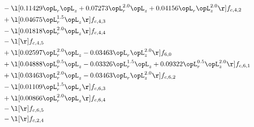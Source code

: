 \begin{alignat}{2}
& - \l[  0.11429 \opL_r \opL_z +  0.07273 \opL_r^{2.0} \opL_z +  0.04156 \opL_r \opL_z^{2.0}  \r] f_{c,4,2} \nonumber \\ 
& + \l[  0.04675 \opL_r^{1.5} \opL_z  \r] f_{c,4,3} \nonumber \\ 
& - \l[  0.01818 \opL_r^{2.0} \opL_z  \r] f_{c,4,4} \nonumber \\ 
& - \l[  \r] f_{c,4,5} \nonumber \\ 
& + \l[  0.02597 \opL_r^{2.0} \opL_z   -0.03463 \opL_r \opL_z^{2.0}  \r] f_{6,0} \nonumber \\ 
& + \l[  0.04888 \opL_r^{0.5} \opL_z   -0.03326 \opL_r^{1.5} \opL_z +  0.09322 \opL_r^{0.5} \opL_z^{2.0}  \r] f_{c,6,1} \nonumber \\ 
& + \l[  0.03463 \opL_r^{2.0} \opL_z   -0.03463 \opL_r \opL_z^{2.0}  \r] f_{c,6,2} \nonumber \\ 
& - \l[  0.01109 \opL_r^{1.5} \opL_z  \r] f_{c,6,3} \nonumber \\ 
& + \l[  0.00866 \opL_r^{2.0} \opL_z  \r] f_{c,6,4} \nonumber \\ 
& - \l[  \r] f_{c,6,5} \nonumber \\ 
& - \l[  \r] f_{c,2,4} \nonumber \\ 
\end{alignat} 


